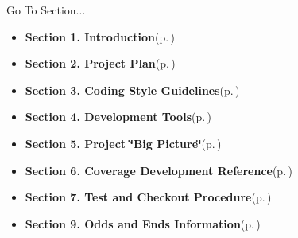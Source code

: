 \begin{Desc}
\item[Go To Section...]\begin{itemize}
\item {\bf Section 1.  Introduction}{\rm (p.\,\pageref{page_intro})}\item {\bf Section 2.  Project Plan}{\rm (p.\,\pageref{page_project_plan})}\item {\bf Section 3.  Coding Style Guidelines}{\rm (p.\,\pageref{page_code_style})}\item {\bf Section 4.  Development Tools}{\rm (p.\,\pageref{page_tools})}\item {\bf Section 5.  Project \char`\"{}Big Picture\char`\"{}}{\rm (p.\,\pageref{page_big_picture})}\item {\bf Section 6.  Coverage Development Reference}{\rm (p.\,\pageref{page_code_details})}\item {\bf Section 7.  Test and Checkout Procedure}{\rm (p.\,\pageref{page_testing})}\item {\bf Section 9.  Odds and Ends Information}{\rm (p.\,\pageref{page_misc})} \end{itemize}
\end{Desc}
